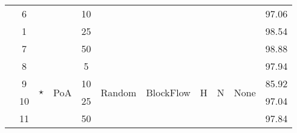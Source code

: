\begin{landscape}
\begin{table}[]
\begin{tabular}{c|c|c|c|c|c|c|c|c|c|c}
                                                                                            & 6                   &                                            &                            & 10                       &                         &                                &                    &                    &                        & 97.06                                  \\
                                                                                            & 1                   &                                            &                            & 25                       &                         &                                &                    &                    &                        & 98.54                                  \\
                                                                                            & 7                   &                                            &                            & 50                       &                         &                                &                    &                    &                        & 98.88                                  \\ \hline
                                                                                            & 8                   & \multirow{4}{*}{$\star$}                         & \multirow{4}{*}{PoA}       & 5                        & \multirow{4}{*}{Random} & \multirow{4}{*}{BlockFlow}     & \multirow{4}{*}{H} & \multirow{4}{*}{N} & \multirow{4}{*}{None}  & 97.94                                  \\
                                                                                            & 9                   &                                            &                            & 10                       &                         &                                &                    &                    &                        & 85.92                                  \\
                                                                                            & 10                  &                                            &                            & 25                       &                         &                                &                    &                    &                        & 97.04                                  \\
                                                                                            & 11                  &                                            &                            & 50                       &                         &                                &                    &                    &                        & 97.84                                  \\ \hline

\end{tabular}
\end{table}
\end{landscape}
